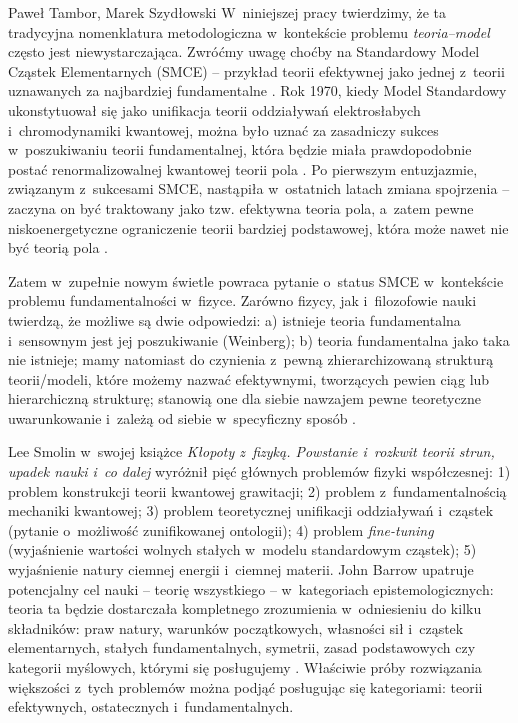 \begin{artplenv2auth}{Paweł Tambor, Marek Szydłowski}
W~niniejszej pracy twierdzimy, że ta tradycyjna nomenklatura metodologiczna w~kontekście problemu \textit{teoria–model} często jest niewystarczająca. Zwróćmy uwagę choćby na Standardowy Model Cząstek Elementarnych (SMCE) -- przykład teorii efektywnej jako jednej z~teorii uznawanych za najbardziej fundamentalne
\parencite[][]{kaplan_effective_1999}. %
 Rok 1970, kiedy Model Standardowy ukonstytuował się jako unifikacja teorii oddziaływań elektrosłabych i~chromodynamiki kwantowej, można było uznać za zasadniczy sukces w~poszukiwaniu teorii fundamentalnej, która będzie miała prawdopodobnie postać renormalizowalnej kwantowej teorii pola 
\parencite[][]{weinberg_newtonianism_1987}. %
 Po pierwszym entuzjazmie, związanym z~sukcesami SMCE, nastąpiła w~ostatnich latach zmiana spojrzenia -- zaczyna on być traktowany jako tzw. efektywna teoria pola, a~zatem pewne niskoenergetyczne ograniczenie teorii bardziej podstawowej, która może nawet nie być teorią pola 
\parencites[][]{hartmann_effective_2001}[por.][]{weinberg_what_1997}.%


Zatem w~zupełnie nowym świetle powraca pytanie o~status SMCE w~kontekście problemu fundamentalności w~fizyce. Zarówno fizycy, jak i~filozofowie nauki twierdzą, że możliwe są dwie odpowiedzi: a) istnieje teoria fundamentalna i~sensownym jest jej poszukiwanie (Weinberg); b) teoria fundamentalna jako taka nie istnieje; mamy natomiast do czynienia z~pewną zhierarchizowaną strukturą teorii/modeli, które możemy nazwać efektywnymi, tworzących pewien ciąg lub hierarchiczną strukturę; stanowią one dla siebie nawzajem pewne teoretyczne uwarunkowanie i~zależą od siebie w~specyficzny sposób
\parencite[][]{cao_conceptual_1993}.%


Lee Smolin w~swojej książce \textit{Kłopoty z~fizyką. Powstanie i~rozkwit teorii strun, upadek nauki i~co dalej}
\parencite*[][]{smolin_klopoty_2008}
wyróżnił pięć głównych problemów fizyki współczesnej: 1) problem konstrukcji teorii kwantowej grawitacji; 2) problem z~fundamentalnością mechaniki kwantowej; 3) problem teoretycznej unifikacji oddziaływań i~cząstek (pytanie o~możliwość zunifikowanej ontologii); 4) problem \textit{fine-tuning} (wyjaśnienie wartości wolnych stałych w~modelu standardowym cząstek); 5) wyjaśnienie natury ciemnej energii i~ciemnej materii.
 John Barrow upatruje potencjalny cel nauki -- teorię wszystkiego -- w~kategoriach epistemologicznych: teoria ta będzie dostarczała kompletnego zrozumienia w~odniesieniu do kilku składników: praw natury, warunków początkowych, własności sił i~cząstek elementarnych, stałych fundamentalnych, symetrii, zasad podstawowych czy kategorii myślowych, którymi się posługujemy 
\parencite[][s.~4]{barrow_new_2007}. %
 Właściwie próby rozwiązania większości z~tych problemów można podjąć posługując się kategoriami: teorii efektywnych, ostatecznych i~fundamentalnych.


\end{artplenv2auth}
